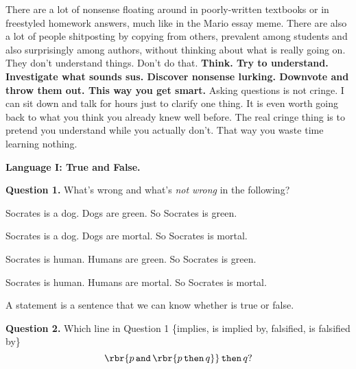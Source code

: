 \documentclass[oneside,12pt]{article}
\def\opthen{\mathop{\mathtt{then}}}
\def\opand{\mathop{\mathtt{and}}}
\begin{document}
There are a lot of nonsense floating around in poorly-written textbooks or in freestyled homework answers, much like in the Mario essay meme. There are also a lot of people shitposting by copying from others, prevalent among students and also surprisingly among authors, without thinking about what is really going on. They don't understand things. Don't do that. \textbf{Think. Try to understand. Investigate what sounds sus. Discover nonsense lurking. Downvote and throw them out. This way you get smart.} Asking questions is not cringe. I can sit down and talk for hours just to clarify one thing. It is even worth going back to what you think you already knew well before. The real cringe thing is to pretend you understand while you actually don't. That way you waste time learning nothing.

\leavevmode

\newpage

\hspace{-0.75in} \textbf{Language I: True and False.}

\leavevmode

\hspace{-0.75in} \textbf{Question 1.} What's wrong and what's \emph{not wrong} in the following?
\begin{mdframed}
\noindent Socrates is a dog. Dogs are green. So Socrates is green.

\noindent Socrates is a dog. Dogs are mortal. So Socrates is mortal.

\noindent Socrates is human. Humans are green. So Socrates is green.

\noindent Socrates is human. Humans are mortal. So Socrates is mortal.

\end{mdframed}

\leavevmode

A statement is a sentence that we can know whether is true or false.

\leavevmode

\hspace{-0.75in} \textbf{Question 2.} Which line in Question 1 \{implies, is implied by, falsified, is falsified by\}
\begin{equation*}
\rbr{ p \opand \rbr{ p \opthen q } } \opthen q?
\end{equation*}
\end{document}
